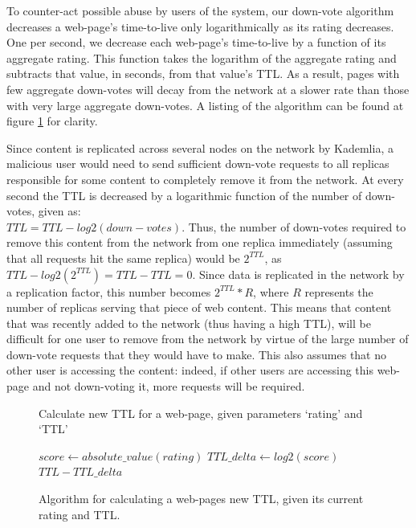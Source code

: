 To counter-act possible abuse by users of the system, our down-vote algorithm decreases a web-page's time-to-live only 
logarithmically as its rating decreases. One per second, we decrease each web-page's time-to-live by a function of its
aggregate rating. This function takes the logarithm of the aggregate rating and subtracts that value, in seconds,
from that value's TTL. As a result, pages with few aggregate down-votes will decay from the network at a slower rate than
those with very large aggregate down-votes. A listing of the algorithm can be found at figure \ref{fig:downvotealgo} for clarity.

Since content is replicated across several nodes on the network by Kademlia, a malicious user would need to send sufficient
down-vote requests to all replicas responsible for some content to completely remove it from the network.
At every second the TTL is decreased by a logarithmic function of the number of down-votes, given as: \\
$ TTL = TTL - log2(down-votes) $.
Thus, the number of down-votes required to remove this content from the network from one replica immediately
(assuming that all requests hit the same replica) would be $ 2^{TTL} $, as $ TTL - log2(2^{TTL}) = TTL - TTL = 0 $.
Since data is replicated in the network by a replication factor, this number becomes $ 2^{TTL} * R $, where $R$
represents the number of replicas serving that piece of web content.
This means that content that was recently added to the network (thus having a high TTL), will be difficult for one
user to remove from the network by virtue of the large number of down-vote requests that they would have to make.
This also assumes that no other user is accessing the content: indeed, if other users are accessing this web-page and
not down-voting it, more requests will be required.

\begin{figure}
    \begin{algorithm}[H]
        \caption{Calculate new TTL for a web-page, given parameters `rating' and `TTL'}
        \begin{algorithmic}
        \ENDIF
        \STATE $ score \leftarrow absolute\_value(rating) $
        \STATE $ TTL\_delta \leftarrow log2(score) $
        \RETURN $ TTL - TTL\_delta $
        \end{algorithmic}
    \end{algorithm}
    \caption{Algorithm for calculating a web-pages new TTL, given its current rating and TTL.}
    \label{fig:downvotealgo}
\end{figure}
